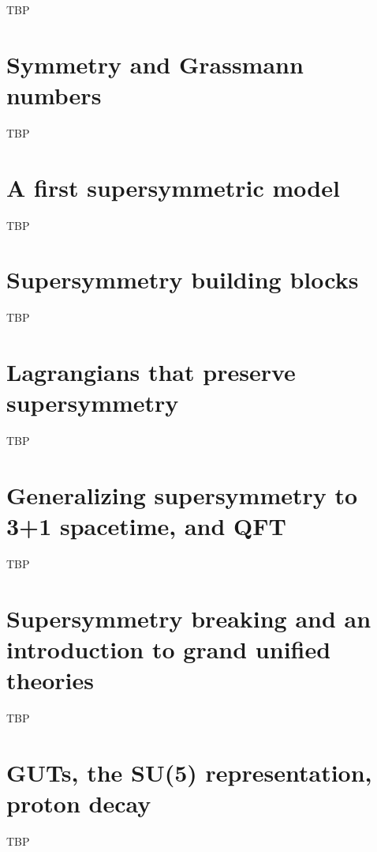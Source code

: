 \documentclass[]{article}
\begin{document}
TBP

\section{Symmetry and Grassmann numbers}

TBP

\section{A first supersymmetric model}

TBP

\section{Supersymmetry building blocks}

TBP

\section{Lagrangians that preserve supersymmetry}

TBP

\section{Generalizing supersymmetry to 3+1 spacetime, and QFT}

TBP

\section{Supersymmetry breaking and an introduction to grand unified theories}

TBP

\section{GUTs, the SU(5) representation, proton decay}

TBP



\raggedright

\end{document}
